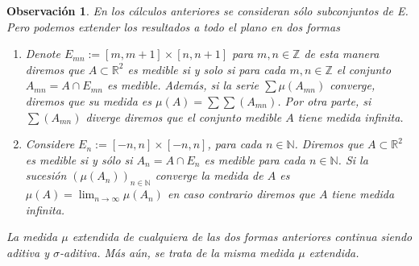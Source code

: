 \documentclass[twoside,12pt,a4 paper,openright]{book}
\newtheorem{ob}[claim]{Observaci\'on}
\begin{document}
\begin{ob}
En los c\'alculos anteriores se consideran s\'olo  subconjuntos de E. Pero podemos extender los resultados a todo el plano en dos formas 
    \begin{enumerate}
        \item Denote $E_{mn} := [m,m+1]\times [n,n+1]$ para $m,n\in \mathbb{Z}$ de esta manera diremos que $A\subset \mathbb{R}^{2}$ es medible si y solo si   para cada $m,n\in \mathbb{Z}$ el conjunto $A_{mn} = A\cap E_{mn}$ es medible. Adem\'as, si la serie $\displaystyle \sum \mu(A_{mn})$ converge, diremos que su medida es $\displaystyle \mu(A) = \sum \sum (A_{mn})$. Por otra parte,   si $\displaystyle \sum (A_{mn})$ diverge diremos que el conjunto medible $A$ tiene medida infinita.

        \item Considere $E_n := [-n,n]\times[-n,n]$, para cada $n\in \mathbb{N}$. Diremos que  $A\subset\mathbb{R}^2$ es medible si y s\'olo si $A_n = A\cap E_n$ es medible para cada $n\in \mathbb{N}$. Si la sucesi\'on $(\mu(A_n))_{n\in\mathbb N} $ converge la medida de $A$ es $\mu(A) = \lim_{n\to \infty} \mu(A_n)$ en  caso contrario  diremos que $A$ tiene medida infinita.

    \end{enumerate}
La medida $\mu$ extendida de cualquiera de las dos formas anteriores  continua siendo aditiva  y $\sigma$-aditiva. M\'as a\'un,   se trata de la misma medida $\mu$ extendida.
    \end{ob}
\end{document}
